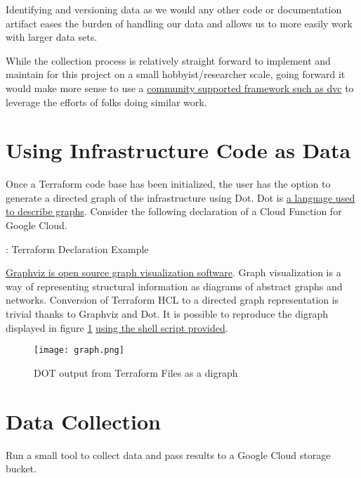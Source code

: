 \justifying
Identifying and
versioning data as we would any other code or documentation artifact eases the
burden of handling our data and allows us to more easily work with larger data sets.
\vspace{2mm}

\justifying
While the collection process is relatively straight forward to implement and maintain for this project on a small hobbyist/researcher scale, going forward it would make more sense to use a \href{https://github.com/iterative/dvc}{community supported framework such as dvc} to leverage the efforts of folks doing similar work.

\section{\label{sec:iacdata}Using Infrastructure Code as Data}

\justifying
Once a Terraform code base has been initialized, the user has the option to generate
a directed graph of the infrastructure using Dot. Dot is \href{https://graphviz.org/doc/info/lang.html}{a language used to describe graphs}. Consider the following declaration of a
Cloud Function for Google Cloud.

\begin{mybox}{\thetcbcounter: Terraform Declaration Example}
    
\end{mybox}

\justifying
\href{https://graphviz.org/}{Graphviz is open source graph visualization software}. Graph visualization is a way
of representing structural information as diagrams of abstract graphs and networks.
Conversion of Terraform HCL to a directed graph representation is trivial thanks to Graphviz and Dot. It is possible to reproduce the
digraph displayed in figure \ref{pygraph} \href{https://github.com/devsecfranklin/model-graph-neural-net/blob/main/paper/code/gen_graph.sh}{using the shell script provided}.

\justifying
\begin{figure}[H]
	\texttt{[image: graph.png]}
	\caption{DOT output from Terraform Files as a digraph}
	\label{pygraph}
\end{figure}

\section{\label{sec:collection}Data Collection}

\justifying
Run a small tool to collect data and pass results to a Google Cloud storage bucket.

